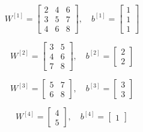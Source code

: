 \documentclass[a4paper,12pt]{article}
\begin{document}
\[
W^{[1]} = \begin{bmatrix}
2 & 4 & 6 \\
3 & 5 & 7 \\
4 & 6 & 8
\end{bmatrix}, \quad b^{[1]} = \begin{bmatrix} 1 \\ 1 \\ 1 \end{bmatrix}
\]

\[
W^{[2]} = \begin{bmatrix}
3 & 5 \\
4 & 6 \\
7 & 8
\end{bmatrix}, \quad b^{[2]} = \begin{bmatrix} 2 \\ 2 \end{bmatrix}
\]

\[
W^{[3]} = \begin{bmatrix}
5 & 7 \\
6 & 8
\end{bmatrix}, \quad b^{[3]} = \begin{bmatrix} 3 \\ 3 \end{bmatrix}
\]

\[
W^{[4]} = \begin{bmatrix}
4 \\
5
\end{bmatrix}, \quad b^{[4]} = \begin{bmatrix} 1 \end{bmatrix}
\]

\end{document}
